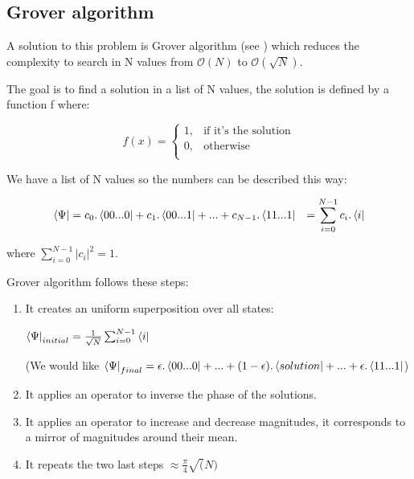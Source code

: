 \subsection{Grover algorithm}

A solution to this problem is Grover algorithm (see \cite{groverWiki}) which reduces the complexity to search in N values from $\mathcal{O}(N)$ to $\mathcal{O}(\sqrt{N})$. \newline

The goal is to find a solution in a list of N values, the solution is defined by a function f where:

\[
  f(x) =
  \begin{cases}
    1, & \text{if it's the solution}  \\
    0, & \text{otherwise} \\
  \end{cases}
\]
\medskip

We have a list of N values so the numbers can be described this way:

\begin{equation}
  \begin{aligned}
    \bra{\Psi} &= c_0 . \bra{00...0} + c_1 . \bra{00...1} + ... + c_{N-1} . \bra{11...1}
    &= \sum_{i=0}^{N-1} c_i . \bra{i}
  \end{aligned}
\end{equation}

where $\sum_{i=0}^{N-1} | c_i |^2 = 1$. \newline

Grover algorithm follows these steps: \newline

\begin{enumerate}
  \item It creates an uniform superposition over all states: \newline

  $\bra{\Psi}_{initial} = \frac{1}{\sqrt{N}} \sum_{i=0}^{N-1} \bra{i}$ \newline

  (We would like $\bra{\Psi}_{final} = \epsilon . \bra{00...0} + ... + (1 - \epsilon) . \bra{solution} + ... + \epsilon . \bra{11...1}$)

  \item It applies an operator to inverse the phase of the solutions.
  \item It applies an operator to increase and decrease magnitudes, it corresponds to a mirror of magnitudes around their mean.
  \item It repeats the two last steps $\approx \frac{\pi}{4} \sqrt(N)$

\end{enumerate}
\medskip

